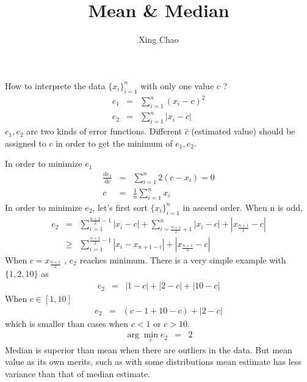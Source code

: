 \documentclass{article}
\newcommand{\mathd}{\mathrm{d}}
\begin{document}
\title{Mean \& Median}

\author{Xing Chao}

\maketitle

How to interprete the data $\{ x_i \}_{i = 1}^n$ with only one value $c$ ?
\begin{eqnarray*}
  e_1 & = & \sum_{i = 1}^n (x_i - c)^2\\
  e_2 & = & \sum_{i = 1}^n | x_i - c |
\end{eqnarray*}
$e_1, e_2$ are two kinds of error functions. Different $\hat{c}$ (estimated
value) should be assigned to $c$ in order to get the minimum of $e_1, e_2$.

In order to minimize $e_1$
\begin{eqnarray*}
  \frac{\mathd e_1}{\mathd c} & = & \sum_{i = 1}^n 2 (c - x_i) = 0\\
  c & = & \frac{1}{n} \sum_{i = 1}^n x_i
\end{eqnarray*}
In order to minimize $e_2$, let's first sort $\{ x_i \}_{i = 1}^n$ in ascend
order. When n is odd,
\begin{eqnarray*}
  e_2 & = & \sum_{i = 1}^{\frac{n + 1}{2} - 1} | x_i - c | + \sum_{i = \frac{n
  + 1}{2} + 1}^n | x_i - c | + \left| x_{\frac{n + 1}{2}} - c \right|\\
  & \geqslant & \sum_{i = 1}^{\frac{n + 1}{2} - 1} | x_i - x_{n + 1 - i} | +
  \left| x_{\frac{n + 1}{2}} - c \right|
\end{eqnarray*}
When $c = x_{\frac{n + 1}{2}}$ , $e_2$ reaches minimum. There is a very simple
example with $\{ 1, 2, 10 \}$ as
\begin{eqnarray*}
  e_2 & = & | 1 - c | + | 2 - c | + | 10 - c |
\end{eqnarray*}
When $c \in [1, 10]$
\begin{eqnarray*}
  e_2 & = & (c - 1 + 10 - c) + | 2 - c |
\end{eqnarray*}
which is smaller than cases when $c < 1$ or $c > 10$.
\begin{eqnarray*}
  \arg \min_c e_2 & = & 2
\end{eqnarray*}
Median is superior than mean when there are outliers in the data. But mean
value as its own merits, such as with some distributions mean estimate has
less variance than that of median estimate.
\end{document}
